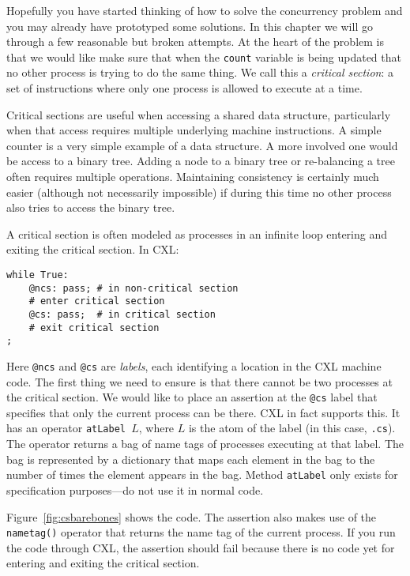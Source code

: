 \documentclass{report}
\newenvironment{code}{
\tcolorbox
}{
\endtcolorbox
}
\begin{document}
Hopefully you have started thinking of how to solve the concurrency
problem and you may already have prototyped some solutions.
In this chapter we will go through a few reasonable but broken attempts.
At the heart of the problem is that we would like make sure that when
the \texttt{count} variable is being updated that no other process is
trying to do the same thing.  We call this a \emph{critical section}: a
set of instructions where only one process is allowed to execute at a
time.

Critical sections are useful when accessing a shared data
structure, particularly when that access requires multiple underlying
machine instructions.  A simple counter is a very simple example of
a data structure.  A more involved one would be access to a binary tree.
Adding a node to a binary tree or re-balancing a tree often requires
multiple operations.  Maintaining consistency is certainly much easier
(although not necessarily impossible) if during this time no other
process also tries to access the binary tree.

A critical section is often modeled as processes in an infinite loop
entering and exiting the critical section.  In CXL:

\begin{code}
\begin{verbatim}
while True:
    @ncs: pass; # in non-critical section
    # enter critical section
    @cs: pass;  # in critical section
    # exit critical section
;
\end{verbatim}
\end{code}

Here \texttt{@ncs} and \texttt{@cs} are \emph{labels}, each identifying
a location in the CXL machine code.  The first thing we need to
ensure is that there cannot be two processes at the critical section.
We would like to place an assertion at the \texttt{@cs} label that
specifies that only the current process can be there.  CXL in fact
supports this.  It has an operator \texttt{atLabel $L$}, where $L$
is the atom of the label (in this case, \texttt{.cs}).  The
operator returns a bag of name tags of processes executing at that
label.  The bag is represented by a dictionary that maps each element
in the bag to the number of times the element appears in the bag.
Method \texttt{atLabel} only exists for specification purposes---do not
use it in normal code.

Figure~\ref{fig:csbarebones} shows the code.
The assertion also makes use of the \texttt{nametag()} operator that
returns the name tag of the current process.
If you run the code through CXL, the assertion should fail because
there is no code yet for entering and exiting the critical section.
\end{document}
